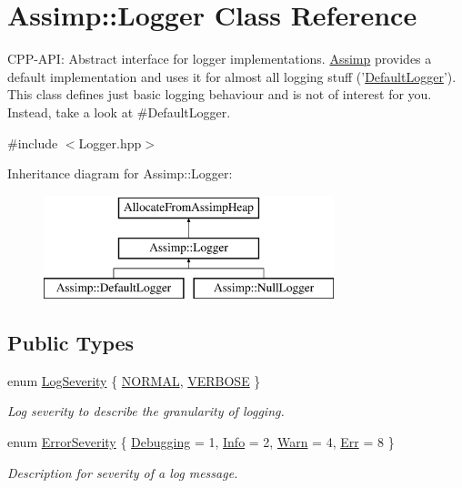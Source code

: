 \hypertarget{class_assimp_1_1_logger}{\section{Assimp\-:\-:Logger Class Reference}
\label{class_assimp_1_1_logger}
}


C\-P\-P-\/\-A\-P\-I\-: Abstract interface for logger implementations. \hyperlink{namespace_assimp}{Assimp} provides a default implementation and uses it for almost all logging stuff ('\hyperlink{class_assimp_1_1_default_logger}{Default\-Logger}'). This class defines just basic logging behaviour and is not of interest for you. Instead, take a look at \#\-Default\-Logger.  




{\ttfamily \#include $<$Logger.\-hpp$>$}

Inheritance diagram for Assimp\-:\-:Logger\-:\begin{figure}[H]
\begin{center}
\leavevmode
\includegraphics[height=3.000000cm]{class_assimp_1_1_logger}
\end{center}
\end{figure}
\subsection*{Public Types}
\begin{DoxyCompactItemize}
\item 
enum \hyperlink{class_assimp_1_1_logger_a8b6248a0fd062431e8572556350d29e6}{Log\-Severity} \{ \hyperlink{class_assimp_1_1_logger_a8b6248a0fd062431e8572556350d29e6a79d16f85dc21486ee489f300027e8eda}{N\-O\-R\-M\-A\-L}, 
\hyperlink{class_assimp_1_1_logger_a8b6248a0fd062431e8572556350d29e6afc9d1d86aa82fdb80e00c99b3c1ce486}{V\-E\-R\-B\-O\-S\-E}
 \}
\begin{DoxyCompactList}\small\item\em Log severity to describe the granularity of logging. \end{DoxyCompactList}\item 
enum \hyperlink{class_assimp_1_1_logger_acd0b52a87d6fc11e957ed2c6e2ad75b6}{Error\-Severity} \{ \hyperlink{class_assimp_1_1_logger_acd0b52a87d6fc11e957ed2c6e2ad75b6a0cb475014d27098c3423738c571d857f}{Debugging} = 1, 
\hyperlink{class_assimp_1_1_logger_acd0b52a87d6fc11e957ed2c6e2ad75b6aa3377a574928b86f7de55c5df154f461}{Info} = 2, 
\hyperlink{class_assimp_1_1_logger_acd0b52a87d6fc11e957ed2c6e2ad75b6a1279c77aaee5a3d7df835a9b9305a697}{Warn} = 4, 
\hyperlink{class_assimp_1_1_logger_acd0b52a87d6fc11e957ed2c6e2ad75b6a71054d0b1323abcea46d050d69013d27}{Err} = 8
 \}
\begin{DoxyCompactList}\small\item\em Description for severity of a log message. \end{DoxyCompactList}\end{DoxyCompactItemize}
